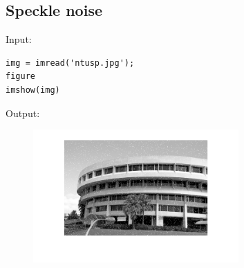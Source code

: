 \documentclass[12pt, a4paper]{article}
\begin{document}
\subsection{Speckle noise}
Input:
\begin{verbatim}
img = imread('ntusp.jpg');
figure
imshow(img)
\end{verbatim}
Output:
\begin{figure}[H]
    \centering
    \includegraphics[width=0.7\textwidth]{fig14.png}
\end{figure}
\end{document}
